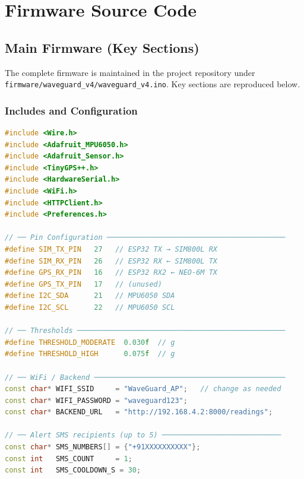 
\chapter{Firmware Source Code}
\label{app:firmware}

\section{Main Firmware (Key Sections)}

The complete firmware is maintained in the project repository under
\texttt{firmware/waveguard\_v4/waveguard\_v4.ino}.
Key sections are reproduced below.

\subsection{Includes and Configuration}

\begin{lstlisting}[language=C++, caption={Firmware – includes and configuration}]
#include <Wire.h>
#include <Adafruit_MPU6050.h>
#include <Adafruit_Sensor.h>
#include <TinyGPS++.h>
#include <HardwareSerial.h>
#include <WiFi.h>
#include <HTTPClient.h>
#include <Preferences.h>

// ── Pin Configuration ──────────────────────────────────────────
#define SIM_TX_PIN   27   // ESP32 TX → SIM800L RX
#define SIM_RX_PIN   26   // ESP32 RX ← SIM800L TX
#define GPS_RX_PIN   16   // ESP32 RX2 ← NEO-6M TX
#define GPS_TX_PIN   17   // (unused)
#define I2C_SDA      21   // MPU6050 SDA
#define I2C_SCL      22   // MPU6050 SCL

// ── Thresholds ─────────────────────────────────────────────────
#define THRESHOLD_MODERATE  0.030f  // g
#define THRESHOLD_HIGH      0.075f  // g

// ── WiFi / Backend ─────────────────────────────────────────────
const char* WIFI_SSID     = "WaveGuard_AP";   // change as needed
const char* WIFI_PASSWORD = "waveguard123";
const char* BACKEND_URL   = "http://192.168.4.2:8000/readings";

// ── Alert SMS recipients (up to 5) ────────────────────────────
const char* SMS_NUMBERS[] = {"+91XXXXXXXXXX"};
const int   SMS_COUNT     = 1;
const int   SMS_COOLDOWN_S = 30;
\end{lstlisting}

